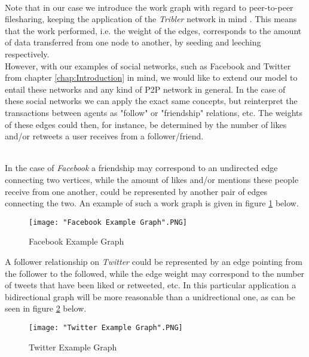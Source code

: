 \begin{remark}[]\ \\
\label{rem:P2P, Twitter, Facebook}
\noindent{}Note that in our case we introduce the work graph with regard to peer-to-peer filesharing, keeping the application of the {\it Tribler} network in mind \cite{Tribler}. This means that the work performed, i.e. the weight of the edges, corresponds to the amount of data transferred from one node to another, by seeding and leeching respectively. \vspace{1em}\\

\noindent{}However, with our examples of social networks, such as Facebook and Twitter from chapter \ref{chap:Introduction} in mind, we would like to extend our model to entail these networks and any kind of P2P network in general. In the case of these social networks we can apply the exact same concepts, but reinterpret the transactions between agents as "follow" or "friendship" relations, etc. The weights of these edges could then, for instance, be determined by the number of likes and/or retweets a user receives from a follower/friend. \vspace{1em}\\
\end{remark}

\begin{example}[]\ \\
\label{ex:Example Graphs (P2P, Twitter, Facebook)}
In the case of {\it Facebook} a friendship may correspond to an undirected edge connecting two vertices, while the amount of likes and/or mentions these people receive from one another, could be represented by another pair of edges connecting the two. An example of such a work graph is given in figure \ref{fig:Facebook Example Graph} below.

\begin{figure}[H]
\begin{center}
\texttt{[image: "Facebook Example Graph".PNG]}
\caption{Facebook Example Graph}
\label{fig:Facebook Example Graph}
\end{center}
\end{figure}

\noindent{}A follower relationship on {\it Twitter} could be represented by an edge pointing from the follower to the followed, while the edge weight may correspond to the number of tweets that have been liked or retweeted, etc. In this particular application a bidirectional graph will be more reasonable than a unidrectional one, as can be seen in figure \ref{fig:Twitter Example Graph} below.
\begin{figure}[H]
\begin{center}
\texttt{[image: "Twitter Example Graph".PNG]}
\caption{Twitter Example Graph}
\label{fig:Twitter Example Graph}
\end{center}
\end{figure}
 
\end{example}

